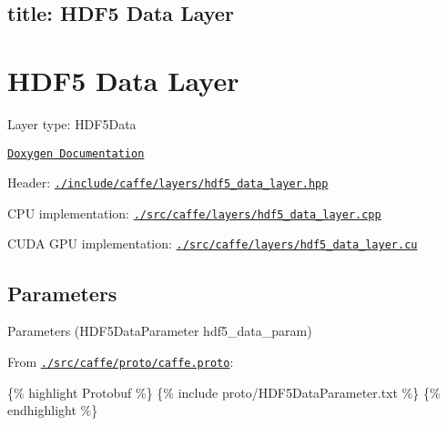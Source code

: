 

 \subsection*{title\+: H\+D\+F5 Data Layer }

\section*{H\+D\+F5 Data Layer}


\begin{DoxyItemize}
\item Layer type\+: {\ttfamily H\+D\+F5\+Data}
\item \href{http://caffe.berkeleyvision.org/doxygen/classcaffe_1_1HDF5DataLayer.html}{\tt Doxygen Documentation}
\item Header\+: \href{https://github.com/BVLC/caffe/blob/master/include/caffe/layers/hdf5_data_layer.hpp}{\tt {\ttfamily ./include/caffe/layers/hdf5\+\_\+data\+\_\+layer.hpp}}
\item C\+PU implementation\+: \href{https://github.com/BVLC/caffe/blob/master/src/caffe/layers/hdf5_data_layer.cpp}{\tt {\ttfamily ./src/caffe/layers/hdf5\+\_\+data\+\_\+layer.cpp}}
\item C\+U\+DA G\+PU implementation\+: \href{https://github.com/BVLC/caffe/blob/master/src/caffe/layers/hdf5_data_layer.cu}{\tt {\ttfamily ./src/caffe/layers/hdf5\+\_\+data\+\_\+layer.cu}}
\end{DoxyItemize}

\subsection*{Parameters}


\begin{DoxyItemize}
\item Parameters ({\ttfamily H\+D\+F5\+Data\+Parameter hdf5\+\_\+data\+\_\+param})
\item From \href{https://github.com/BVLC/caffe/blob/master/src/caffe/proto/caffe.proto}{\tt {\ttfamily ./src/caffe/proto/caffe.proto}}\+:
\end{DoxyItemize}

\{\% highlight Protobuf \%\} \{\% include proto/\+H\+D\+F5\+Data\+Parameter.\+txt \%\} \{\% endhighlight \%\} 